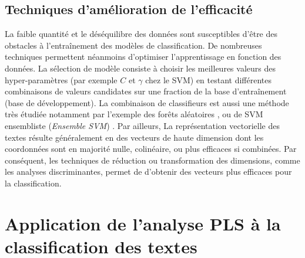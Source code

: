 \subsection{Techniques d'amélioration de l'efficacité}
La faible quantité \citep{ruparel2013smalldataclass} et le déséquilibre des données sont susceptibles d'être des obstacles à l'entraînement des modèles de classification. De nombreuses techniques permettent néanmoins d'optimiser l'apprentissage en fonction des données. La sélection de modèle consiste à choisir les meilleures valeurs des hyper-paramètres (par exemple $C$ et $\gamma$ chez le SVM) en testant différentes combinaisons de valeurs candidates sur une fraction de la base d'entraînement (base de développement). La combinaison de classifieurs est aussi une méthode très étudiée \citep{kittler1996combiningclassifiers,kuncheva2004combiningclassifiers, tulyakov2008combiningclassifiers} notamment par l'exemple des forêts aléatoires \citep{breiman2001randomforest}, ou de SVM ensembliste (\textit{Ensemble SVM}) \citep{dong2005ensembleSVM}.
Par ailleurs, La représentation vectorielle des textes résulte généralement en des vecteurs de haute dimension dont les  coordonnées sont en majorité nulle, colinéaire, ou plus efficaces si combinées. Par conséquent, les techniques de réduction ou transformation des dimensions, comme les analyses discriminantes, permet de d'obtenir des vecteurs plus efficaces pour la classification.

\section{Application de l'analyse PLS  à la classification des textes}
\label{sec:sensresultat:pls}

